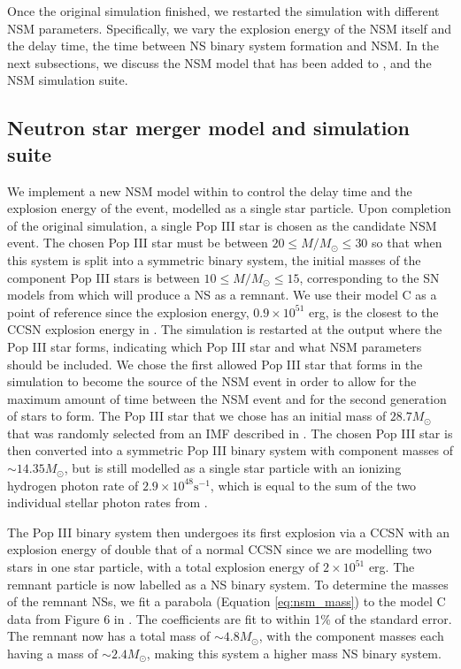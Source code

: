 \documentclass[fleqn,usenatbib]{mnras}
\begin{document}
Once the original simulation finished, we restarted the simulation with different NSM parameters. Specifically, we vary the explosion energy of the NSM itself and the delay time, the time between NS binary system formation and NSM. In the next subsections, we discuss the NSM model that has been added to \enzo{}, and the NSM simulation suite.

\subsection{Neutron star merger model and simulation suite} \label{sec:NSM_model}
We implement a new NSM model within \enzo{} to control the delay time and the explosion energy of the event, modelled as a single star particle. Upon completion of the original simulation, a single Pop III star is chosen as the candidate NSM event. The chosen Pop III star must be between $20 \leq M / M_{\odot} \leq 30$ so that when this system is split into a symmetric binary system, the initial masses of the component Pop III stars is between $10 \leq M / M_{\odot} \leq 15$, corresponding to the SN models from \citet{Heger10} which will produce a NS as a remnant. We use their model C as a point of reference since the explosion energy, $0.9 \times 10^{51}$ erg, is the closest to the CCSN explosion energy in \enzo{}. The simulation is restarted at the output where the Pop III star forms, indicating which Pop III star and what NSM parameters should be included. We chose the first allowed Pop III star that forms in the simulation to become the source of the NSM event in order to allow for the maximum amount of time between the NSM event and for the second generation of stars to form. The Pop III star that we chose has an initial mass of $28.7 M_{\odot}$ that was randomly selected from an IMF described in \citet{Skinner20}. The chosen Pop III star is then converted into a symmetric Pop III binary system with component masses of $\sim 14.35 M_{\odot}$, but is still modelled as a single star particle with an ionizing hydrogen photon rate of $2.9 \times 10^{48} \mathrm{s}^{-1}$, which is equal to the sum of the two individual stellar photon rates from \citet{Schaerer02}.

The Pop III binary system then undergoes its first explosion via a CCSN with an explosion energy of double that of a normal CCSN since we are modelling two stars in one star particle, with a total explosion energy of $2 \times 10^{51}$ erg. The remnant particle is now labelled as a NS binary system. To determine the masses of the remnant NSs, we fit a parabola (Equation \ref{eq:nsm_mass}) to the model C data from Figure 6 in \citet{Heger10}. The coefficients are fit to within 1\% of the standard error. The remnant now has a total mass of $\sim 4.8 M_{\odot}$, with the component masses each having a mass of $\sim 2.4 M_{\odot}$, making this system a higher mass NS binary system.
\end{document}
